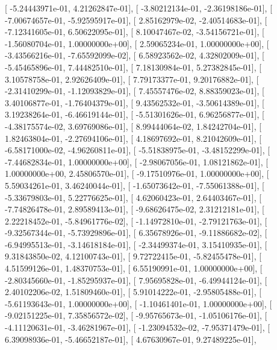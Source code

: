 \documentclass{article}
\begin{document}
       [ -5.24443971e-01,   4.21262847e-01],
       [ -3.80212134e-01,  -2.36198186e-01],
       [ -7.00674657e-01,  -5.92595917e-01],
       [  2.85162979e-02,  -2.40514683e-01],
       [ -7.12341605e-01,   6.50622095e-01],
       [  8.10047467e-02,  -3.54156721e-01],
       [ -1.56080704e-01,   1.00000000e+00],
       [  2.59065234e-01,   1.00000000e+00],
       [ -3.43566216e-01,  -7.65592099e-02],
       [  6.58923562e-02,   4.32802009e-01],
       [ -5.45465896e-01,   7.44482510e-01],
       [  7.18130984e-01,   5.27382845e-01],
       [  3.10578758e-01,   2.92626409e-01],
       [  7.79173377e-01,   9.20176882e-01],
       [ -2.31410299e-01,  -1.12093829e-01],
       [  7.45557476e-02,   8.88359023e-01],
       [  3.40106877e-01,  -1.76404379e-01],
       [  9.43562532e-01,  -3.50614389e-01],
       [  3.19238264e-01,  -6.46619144e-01],
       [ -5.51301626e-01,   6.96256877e-01],
       [ -4.38175574e-02,   3.69769086e-01],
       [  8.99444064e-02,   1.84242704e-01],
       [  1.82463804e-01,  -2.27694106e-01],
       [  4.18697692e-01,   8.21042609e-01],
       [ -6.58171000e-02,  -4.96260811e-01],
       [ -5.51838975e-01,  -3.48152299e-01],
       [ -7.44682834e-01,   1.00000000e+00],
       [ -2.98067056e-01,   1.08121862e-01],
       [  1.00000000e+00,   2.45806570e-01],
       [ -9.17510976e-01,   1.00000000e+00],
       [  5.59034261e-01,   3.46240044e-01],
       [ -1.65073642e-01,  -7.55061388e-01],
       [ -5.33679803e-01,   5.22776625e-01],
       [  4.62060423e-01,   2.64403467e-01],
       [ -7.74826478e-01,   2.89589413e-01],
       [ -9.68626475e-02,   2.31212181e-01],
       [  2.22218452e-01,  -5.84961776e-02],
       [ -1.14972810e-01,  -2.79121763e-01],
       [ -9.32567344e-01,  -5.73929896e-01],
       [  6.35678926e-01,  -9.11886682e-02],
       [ -6.94995513e-01,  -3.14618184e-01],
       [ -2.34499374e-01,   3.15410935e-01],
       [  9.31843850e-02,   4.12100743e-01],
       [  9.72722415e-01,  -5.82455478e-01],
       [  4.51599126e-01,   1.48370753e-01],
       [  6.55190991e-01,   1.00000000e+00],
       [ -2.80345660e-01,  -1.85295937e-01],
       [  7.95695828e-01,  -6.49944124e-01],
       [  2.40102206e-02,   1.51809460e-01],
       [  5.91014222e-01,  -2.95805488e-01],
       [ -5.61193643e-01,   1.00000000e+00],
       [ -1.10461401e-01,   1.00000000e+00],
       [ -9.02151225e-01,   7.35856572e-02],
       [ -9.95765673e-01,  -1.05106176e-01],
       [ -4.11120631e-01,  -3.46281967e-01],
       [ -1.23094532e-02,  -7.95371479e-01],
       [  6.39098936e-01,  -5.46652187e-01],
       [  4.67630967e-01,   9.27489225e-01],
\end{document}
